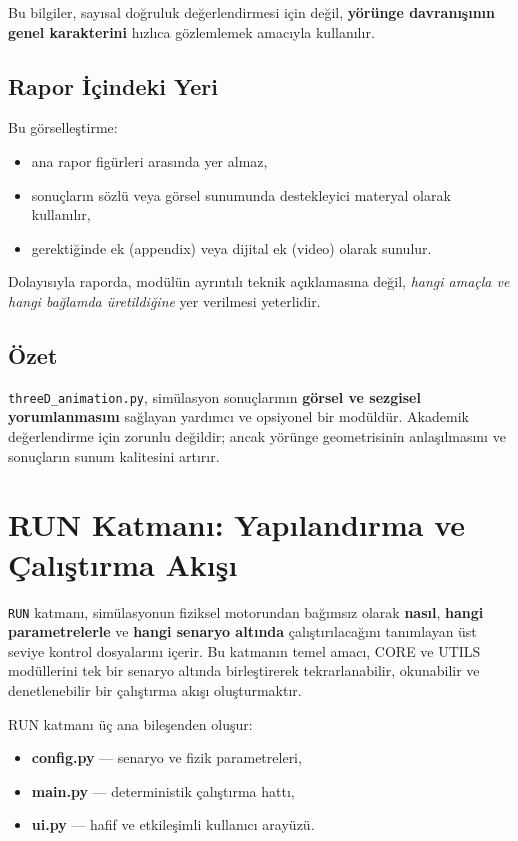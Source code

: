 Bu bilgiler, sayısal doğruluk değerlendirmesi için değil,
\textbf{yörünge davranışının genel karakterini}
hızlıca gözlemlemek amacıyla kullanılır.

\subsection*{Rapor İçindeki Yeri}
Bu görselleştirme:
\begin{itemize}
  \item ana rapor figürleri arasında yer almaz,
  \item sonuçların sözlü veya görsel sunumunda destekleyici materyal olarak kullanılır,
  \item gerektiğinde ek (appendix) veya dijital ek (video) olarak sunulur.
\end{itemize}

Dolayısıyla raporda,
modülün ayrıntılı teknik açıklamasına değil,
\emph{hangi amaçla ve hangi bağlamda üretildiğine}
yer verilmesi yeterlidir.

\subsection*{Özet}
\texttt{threeD\_animation.py}, simülasyon sonuçlarının
\textbf{görsel ve sezgisel yorumlanmasını} sağlayan
yardımcı ve opsiyonel bir modüldür.
Akademik değerlendirme için zorunlu değildir;
ancak yörünge geometrisinin anlaşılmasını ve
sonuçların sunum kalitesini artırır.


\newpage
\section{RUN Katmanı: Yapılandırma ve Çalıştırma Akışı}
\label{sec:run_files}

\texttt{RUN} katmanı, simülasyonun fiziksel motorundan bağımsız olarak \textbf{nasıl}, \textbf{hangi parametrelerle} ve \textbf{hangi senaryo altında} çalıştırılacağını tanımlayan üst seviye kontrol dosyalarını içerir.
Bu katmanın temel amacı, CORE ve UTILS modüllerini tek bir senaryo altında birleştirerek tekrarlanabilir, okunabilir ve denetlenebilir bir çalıştırma akışı oluşturmaktır.

RUN katmanı üç ana bileşenden oluşur:
\begin{itemize}
  \item \textbf{config.py} — senaryo ve fizik parametreleri,
  \item \textbf{main.py} — deterministik çalıştırma hattı,
  \item \textbf{ui.py} — hafif ve etkileşimli kullanıcı arayüzü.
\end{itemize}

